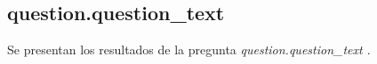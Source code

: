 \documentclass{article}
\begin{document}
  \subsection{ {{ question.question_text }} }

  Se presentan los resultados de la pregunta \emph{ {{ question.question_text }} }.

\end{document}
